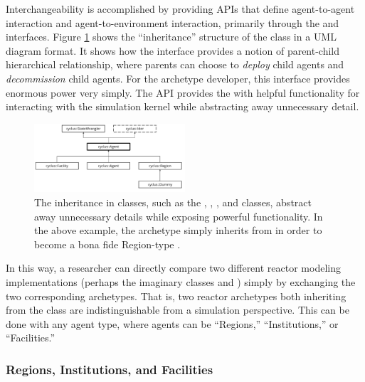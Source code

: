 Interchangeability is accomplished by providing \glspl{API} that define agent-to-agent
interaction and agent-to-environment interaction, primarily through the
 and  interfaces. Figure \ref{fig:agent_uml} shows
the ``inheritance'' structure of the  class in a \gls{UML} diagram
format. It shows how the  interface
provides a notion of parent-child hierarchical relationship, where parents can
choose to \textit{deploy} child agents and \textit{decommission} child
agents. For the archetype developer, this interface provides enormous power
very simply. The \gls{API} provides the  with helpful functionality for
interacting with the \Cyclus simulation kernel while abstracting away unnecessary
detail.

\begin{figure}[htbp!]
\begin{center}
\includegraphics[width=0.5\textwidth]{./images/agent_uml}
\end{center}
\caption{The inheritance in \Cyclus classes, such as the ,
, , and  classes, abstract away
unnecessary details while exposing powerful functionality. In the above
example, the  archetype simply inherits from  in
order to become a bona fide Region-type .}
\label{fig:agent_uml}
\end{figure}

In this way, a researcher can directly compare two different reactor modeling
implementations (perhaps the imaginary classes  and )
simply by exchanging the two corresponding archetypes. That is, two reactor
archetypes both inheriting from the  class are indistinguishable
from a simulation perspective.  This can be done with any agent type, where agents can be ``Regions,'' ``Institutions,'' or ``Facilities.''

\subsubsection{Regions, Institutions, and Facilities}

